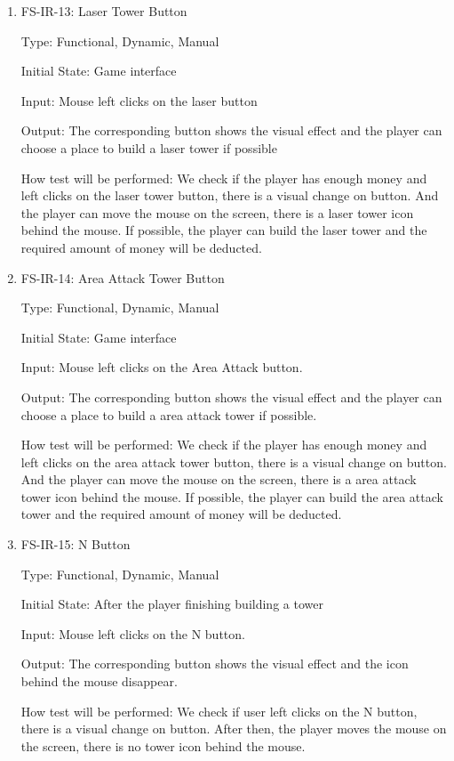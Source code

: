 \documentclass[12pt]{article}
\begin{document}
\begin{enumerate}
	\item{FS-IR-13: Laser Tower Button}
					
	Type: Functional, Dynamic, Manual
					
	Initial State: Game interface
					
	Input: Mouse left clicks on the laser button
					
	Output: The corresponding button shows the visual effect and the player can choose a place to build a laser tower if possible
					
	How test will be performed: We check if the player has enough money and left clicks on the laser tower button, there is a visual change on button. And the player can move the mouse on the screen, there is a laser tower icon behind the mouse. If possible, the player can build the laser tower and the required amount of money will be deducted.
	
	\item{FS-IR-14: Area Attack Tower Button}
					
	Type: Functional, Dynamic, Manual
					
	Initial State: Game interface
					
	Input: Mouse left clicks on the Area Attack button.
					
	Output: The corresponding button shows the visual effect and the player can choose a place to build a area attack tower if possible.
					
	How test will be performed: We check if the player has enough money and left clicks on the area attack tower button, there is a visual change on button. And the player can move the mouse on the screen, there is a area attack tower icon behind the mouse. If possible, the player can build the area attack tower and the required amount of money will be deducted.
	
	\item{FS-IR-15: N Button}
					
	Type: Functional, Dynamic, Manual
					
	Initial State: After the player finishing building a tower
					
	Input: Mouse left clicks on the N button.
					
	Output: The corresponding button shows the visual effect and the icon behind the mouse disappear.
					
	How test will be performed: We check if user left clicks on the N button, there is a visual change on button. After then, the player moves the mouse on the screen, there is no tower icon behind the mouse. 	
	

\end{enumerate}
\end{document}
